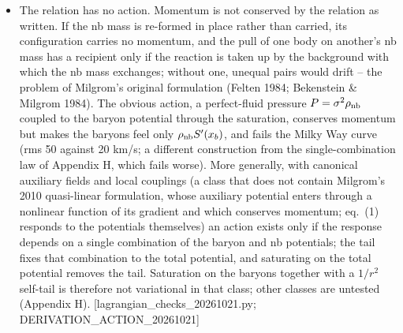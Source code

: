 \documentclass[
  10pt,
]{article}
\begin{document}
\begin{itemize}
\item The relation has no action. Momentum is not conserved by the relation as written. If the nb mass is re-formed in place rather than carried, its configuration carries no momentum, and the pull of one body on another's nb mass has a recipient only if the reaction is taken up by the background with which the nb mass exchanges; without one, unequal pairs would drift -- the problem of Milgrom's original formulation (Felten 1984; Bekenstein \& Milgrom 1984). The obvious action, a perfect-fluid pressure $P=\sigma^2\rho_{\rm nb}$ coupled to the baryon potential through the saturation, conserves momentum but makes the baryons feel only $\rho_{\rm nb}S'(x_b)$, and fails the Milky Way curve (rms 50 against 20 km/s; a different construction from the single-combination law of Appendix H, which fails worse). More generally, with canonical auxiliary fields and local couplings (a class that does not contain Milgrom's 2010 quasi-linear formulation, whose auxiliary potential enters through a nonlinear function of its gradient and which conserves momentum; eq.~(1) responds to the potentials themselves) an action exists only if the response depends on a single combination of the baryon and nb potentials; the tail fixes that combination to the total potential, and saturating on the total potential removes the tail. Saturation on the baryons together with a $1/r^2$ self-tail is therefore not variational in that class; other classes are untested (Appendix H). {[}lagrangian\_checks\_20261021.py; DERIVATION\_ACTION\_20261021{]}

\end{itemize}
\end{document}
